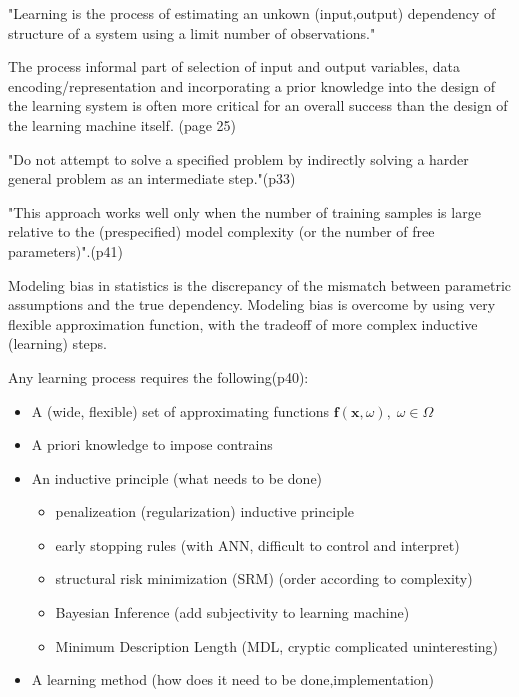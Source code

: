 {"Learning is the process of estimating an unkown (input,output) dependency of structure of a system using a limit number of observations."\cite{cherkassky1998learning}

The process informal part of selection of input and output variables, data encoding/representation and incorporating a prior knowledge into the design of the learning system is often more critical for an overall success than the design of the learning machine itself.\cite{cherkassky1998learning} (page 25)

"Do not attempt to solve a specified problem by indirectly solving a harder general problem as an intermediate step."\cite{cherkassky1998learning}(p33)

"This approach works well only when the number of training samples is large relative to the (prespecified) model complexity (or the number of free parameters)".\cite{cherkassky1998learning}(p41)

Modeling bias in statistics is the discrepancy of the mismatch between parametric assumptions and the true dependency.
Modeling bias is overcome by using very flexible approximation function, with the tradeoff of more complex inductive (learning) steps. 

Any learning process requires the following(p40): 
\begin{itemize}
	\item A (wide, flexible) set of approximating functions $\mathbf{f}(\mathbf{x},\omega),\; \omega \in \Omega$
	\item A priori knowledge to impose contrains
	\item An inductive principle (what needs to be done)
		\begin{itemize}
			\item penalizeation (regularization) inductive principle
			\item early stopping rules (with ANN, difficult to control and interpret)
			\item structural risk minimization (SRM) (order according to complexity)
			\item Bayesian Inference (add subjectivity to learning machine)
			\item Minimum Description Length (MDL, cryptic complicated uninteresting)
		\end{itemize}
	\item A learning method (how does it need to be done,implementation)
\end{itemize}
\cite{cherkassky1998learning}

}
